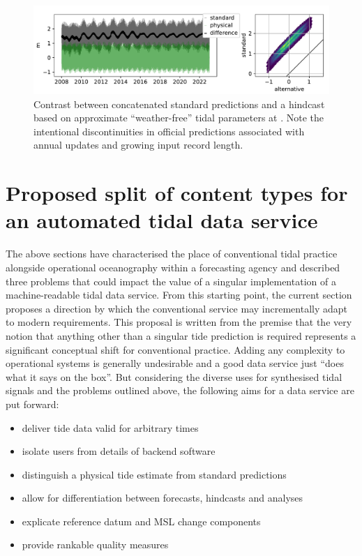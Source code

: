 \begin{figure}[H]\centering
    \includegraphics[width=\figwidthFull]{figures/plots/piecewiseTide_62430.pdf}
        \caption{Contrast between concatenated standard predictions and a hindcast based on approximate ``weather-free'' tidal parameters at \Dname{}.  Note the intentional discontinuities in official predictions associated with annual updates and growing input record length.}
    \label{fig:tideHistoryTs}
\end{figure}   

\section{Proposed split of content types for an automated tidal data service}
\label{Sec:proposed}
The above sections have characterised the place of conventional tidal practice alongside operational oceanography within a forecasting agency and described three problems that could impact the value of a singular implementation of a machine-readable tidal data service.   From this starting point, the current section proposes a direction by which the conventional service may incrementally adapt to modern requirements.  This proposal is written from the premise that the very notion that anything other than a singular tide prediction is required represents a significant conceptual shift for conventional practice.
Adding any complexity to operational systems is generally undesirable and a good data service just ``does what it says on the box''.  But considering the diverse uses for synthesised tidal signals and the problems outlined above, the following aims for a data service are put forward: 
\begin{itemize}
    \item deliver tide data valid for arbitrary times
    \item isolate users from details of backend software 
    \item distinguish a physical tide estimate from standard predictions
    \item allow for differentiation between forecasts, hindcasts and analyses
    \item explicate reference datum and MSL change components
    \item provide rankable quality measures
\end{itemize}

